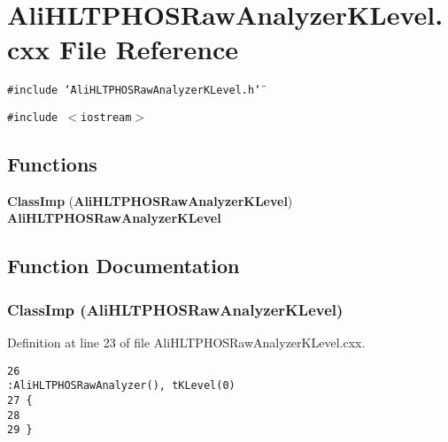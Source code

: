 \section{Ali\-HLTPHOSRaw\-Analyzer\-KLevel.cxx File Reference}
\label{AliHLTPHOSRawAnalyzerKLevel_8cxx}


{\tt \#include \char`\"{}Ali\-HLTPHOSRaw\-Analyzer\-KLevel.h\char`\"{}}\par
{\tt \#include $<$iostream$>$}\par
\subsection*{Functions}
\begin{CompactItemize}
\item 
{\bf Class\-Imp} ({\bf Ali\-HLTPHOSRaw\-Analyzer\-KLevel}) {\bf Ali\-HLTPHOSRaw\-Analyzer\-KLevel}
\end{CompactItemize}


\subsection{Function Documentation}
\subsubsection{\setlength{\rightskip}{0pt plus 5cm}Class\-Imp ({\bf Ali\-HLTPHOSRaw\-Analyzer\-KLevel})}\label{AliHLTPHOSRawAnalyzerKLevel_8cxx_a0}




Definition at line 23 of file Ali\-HLTPHOSRaw\-Analyzer\-KLevel.cxx.

\footnotesize\begin{verbatim}26                                                                                           :AliHLTPHOSRawAnalyzer(), tKLevel(0)
27 {
28 
29 }
\end{verbatim}\normalsize 


